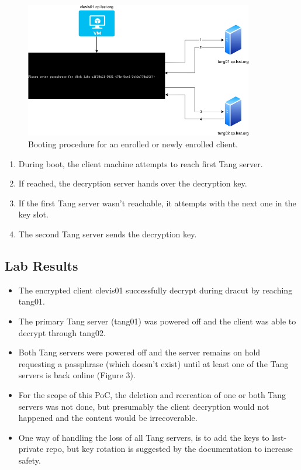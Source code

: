 \begin{figure}
  \includegraphics[width=10cm]{images/image4.png}
  \centering
  \caption{Booting procedure for an enrolled or newly enrolled client.}
\end{figure}

\begin{enumerate}
  \item During boot, the client machine attempts to reach first Tang server.
  \item If reached, the decryption server hands over the decryption key.
  \item If the first Tang server wasn't reachable, it attempts with the next one in the key slot.
  \item The second Tang server sends the decryption key.
\end{enumerate}

\newpage
\subsection{Lab Results}
\begin{itemize}
  \item The encrypted client clevis01 successfully decrypt during dracut by reaching tang01.
  \item The primary Tang server (tang01) was powered off and the client was able to decrypt through tang02.
  \item Both Tang servers were powered off and the server remains on hold requesting a passphrase (which doesn't exist) until at least one of the Tang servers is back online (Figure 3).
  \item For the scope of this PoC, the deletion and recreation of one or both Tang servers was not done, but presumably the client decryption would not happened and the content would be irrecoverable.
  \item One way of handling the loss of all Tang servers, is to add the keys to lsst-private repo, but key rotation is suggested by the documentation to increase safety.
\end{itemize}


